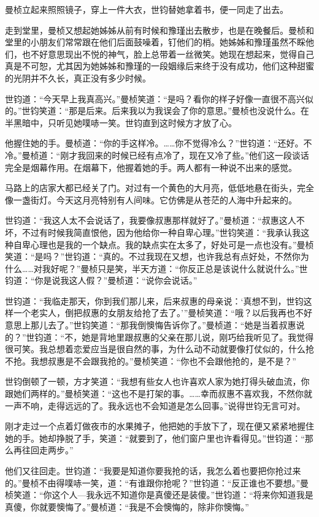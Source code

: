 \par 曼桢立起来照照镜子，穿上一件大衣，世钧替她拿着书，便一同走了出去。
\par 走到堂里，曼桢又想起她姊姊从前有时候和豫瑾出去散步，也是在晚餐后。曼桢和堂里的小朋友们常常跟在他们后面鼓噪着，钉他们的梢。她姊姊和豫瑾虽然不睬他们，也不好意思现出不悦的神气，脸上总带着一丝微笑。她现在想起来，觉得自己真是不可恕，尤其因为她姊姊和豫瑾的一段姻缘后来终于没有成功，他们这种甜蜜的光阴并不久长，真正没有多少时候。
\par 世钧道：“今天早上我真高兴。”曼桢笑道：“是吗？看你的样子好像一直很不高兴似的。”世钧笑道：“那是后来。后来我以为我误会了你的意思。”曼桢也没说什么。在半黑暗中，只听见她噗哧一笑。世钧直到这时候方才放了心。
\par 他握住她的手。曼桢道：“你的手这样冷。……你不觉得冷么？”世钧道：“还好。不冷。”曼桢道：“刚才我回来的时候已经有点冷了，现在又冷了些。”他们这一段谈话完全是烟幕作用。在烟幕下，他握着她的手。两人都有一种说不出来的感觉。
\par 马路上的店家大都已经关了门。对过有一个黄色的大月亮，低低地悬在街头，完全像一盏街灯。今天这月亮特别有人间味。它仿佛是从苍茫的人海中升起来的。
\par 世钧道：“我这人太不会说话了，我要像叔惠那样就好了。”曼桢道：“叔惠这人不坏，不过有时候我简直恨他，因为他给你一种自卑心理。”世钧笑道：“我承认我这种自卑心理也是我的一个缺点。我的缺点实在太多了，好处可是一点也没有。”曼桢笑道：“是吗？”世钧道：“真的。不过我现在又想，也许我总有点好处，不然你为什么……对我好呢？”曼桢只是笑，半天方道：“你反正总是该说什么就说什么。”世钧道：“你是说我这人假？”曼桢道：“说你会说话。”
\par 世钧道：“我临走那天，你到我们那儿来，后来叔惠的母亲说：‘真想不到，世钧这样一个老实人，倒把叔惠的女朋友给抢了去了。’”曼桢笑道：“哦？以后我再也不好意思上那儿去了。”世钧笑道：“那我倒懊悔告诉你了。”曼桢道：“她是当着叔惠说的？”世钧道：“不，她是背地里跟叔惠的父亲在那儿说，刚巧给我听见了。我觉得很可笑。我总想着恋爱应当是很自然的事，为什么动不动就要像打仗似的，什么抢不抢。我想叔惠是不会跟我抢的。”曼桢笑道：“你也不会跟他抢的，是不是？”
\par 世钧倒顿了一顿，方才笑道：“我想有些女人也许喜欢人家为她打得头破血流，你跟她们两样的。”曼桢笑道：“这也不是打架的事。……幸而叔惠不喜欢我，不然你就一声不响，走得远远的了。我永远也不会知道是怎么回事。”说得世钧无言可对。
\par 刚才走过一个点着灯做夜市的水果摊子，他把她的手放下了，现在便又紧紧地握住她的手。她却挣脱了手，笑道：“就要到了，他们窗户里也许看得见。”世钧道：“那么再往回走两步。”
\par 他们又往回走。世钧道：“我要是知道你要我抢的话，我怎么着也要把你抢过来的。”曼桢不由得噗哧一笑，道：“有谁跟你抢呢？”世钧道：“反正谁也不要想。”曼桢笑道：“你这个人—我永远不知道你是真傻还是装傻。”世钧道：“将来你知道我是真傻，你就要懊悔了。”曼桢道：“我是不会懊悔的，除非你懊悔。”
